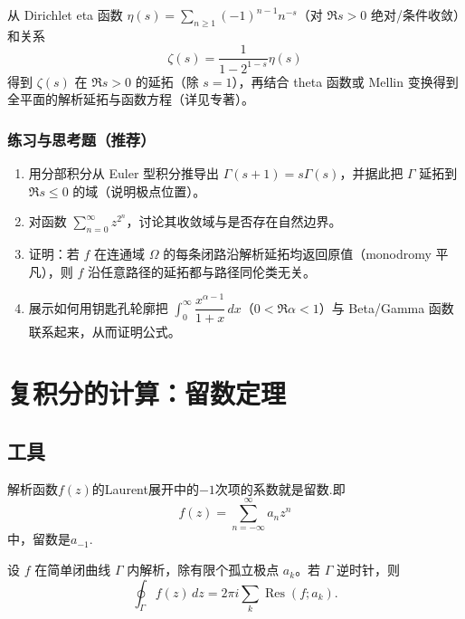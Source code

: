 \documentclass[lang=cn,10pt]{elegantbook}
\begin{document}
	\begin{example}
		从 Dirichlet eta 函数 \(\eta(s)=\sum_{n\ge1}(-1)^{n-1}n^{-s}\)（对 \(\Re s>0\) 绝对/条件收敛）和关系
		\[
		\zeta(s) = \frac{1}{1-2^{1-s}}\eta(s)
		\]
		得到 \(\zeta(s)\) 在 \(\Re s>0\) 的延拓（除 \(s=1\)），再结合 theta 函数或 Mellin 变换得到全平面的解析延拓与函数方程（详见专著）。
	\end{example}
	
	\subsection*{练习与思考题（推荐）}
	\begin{enumerate}
		\item 用分部积分从 Euler 型积分推导出 \(\Gamma(s+1)=s\Gamma(s)\)，并据此把 \(\Gamma\) 延拓到 \(\Re s\le 0\) 的域（说明极点位置）。
		\item 对函数 \(\sum_{n=0}^\infty z^{2^n}\)，讨论其收敛域与是否存在自然边界。
		\item 证明：若 \(f\) 在连通域 \(\Omega\) 的每条闭路沿解析延拓均返回原值（monodromy 平凡），则 \(f\) 沿任意路径的延拓都与路径同伦类无关。
		\item 展示如何用钥匙孔轮廓把 \(\int_0^\infty \dfrac{x^{\alpha-1}}{1+x}\,dx\)（\(0<\Re\alpha<1\)）与 Beta/Gamma 函数联系起来，从而证明公式。
	\end{enumerate}
	

	\chapter{复积分的计算：留数定理}
	\section{工具}
	\begin{definition}[留数]
		解析函数\(f(z)\)的Laurent展开中的\(-1\)次项的系数就是留数.即
		\[f(z)=\sum_{n=-\infty}^\infty a_nz^n\]中，留数是\(a_{-1}\).
	\end{definition}
	\begin{definition}[留数定理] 
		设 \(f\) 在简单闭曲线 \(\Gamma\) 内解析，除有限个孤立极点 \(a_k\)。若 \(\Gamma\) 逆时针，则
		\[
		\oint_{\Gamma} f(z)\,dz = 2\pi i \sum_k \operatorname{Res}(f;a_k).
		\]
	\end{definition}
	
\end{document}
